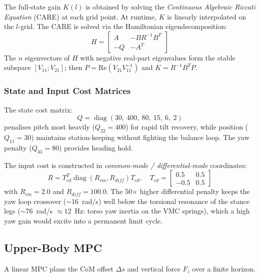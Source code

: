 \documentclass[11pt,a4paper]{article}
\begin{document}
The full-state gain $K(l)$ is obtained by solving the \emph{Continuous Algebraic Riccati
Equation} (CARE) at each grid point.  At runtime, $K$ is linearly interpolated on the
$l$-grid.  The CARE is solved via the Hamiltonian eigendecomposition:
\begin{equation}
    H = \begin{bmatrix} A & -B R^{-1} B^T \\ -Q & -A^T \end{bmatrix}
\end{equation}
The $n$ eigenvectors of $H$ with negative real-part eigenvalues form the stable subspace
$[V_{11};V_{21}]$; then $P = \text{Re}(V_{21}V_{11}^{-1})$ and $K = R^{-1}B^T P$.

\subsubsection{State and Input Cost Matrices}

The state cost matrix:
\begin{equation}
    Q = \operatorname{diag}(30,\ 400,\ 80,\ 15,\ 6,\ 2)
\end{equation}
penalises pitch most heavily ($Q_{22} = 400$) for rapid tilt recovery, while position
($Q_{11} = 30$) maintains station-keeping without fighting the balance loop.  The yaw
penalty ($Q_{33} = 80$) provides heading hold.

The input cost is constructed in \emph{common-mode / differential-mode} coordinates:
\begin{equation}
    R = T_{cd}^T \operatorname{diag}(R_{cm}, R_{diff}) T_{cd}, \quad
    T_{cd} = \begin{bmatrix} 0.5 & 0.5 \\ -0.5 & 0.5 \end{bmatrix}
\end{equation}
with $R_{cm} = 2.0$ and $R_{diff} = 100.0$.  The 50$\times$ higher differential penalty
keeps the yaw loop crossover ($\sim$16~rad/s) well below the torsional resonance of the
stance legs ($\sim$76~rad/s $\approx 12$~Hz: torso yaw inertia on the VMC springs), which
a high yaw gain would excite into a permanent limit cycle.

\subsection{Upper-Body MPC}

A linear MPC plans the CoM offset $\Delta s$ and vertical force $F_z$ over a finite
horizon.
\end{document}
